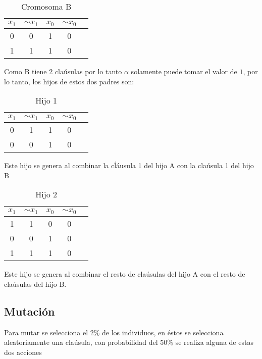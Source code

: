 \documentclass[a4paper]{article}
\begin{document}
\begin{table}[H]
	\centering
	\caption{Cromosoma B}
	\begin{tabular}{|c | c | c|  c|  c|}
		\hline
		$x_1$ & $ \sim{x_1}$ & $x_0$ & $ \sim{x_0}$\\
		\hline
		0 & 0& 1 & 0\\
		\hline
		1 & 1& 1 & 0\\
		\hline
	\end{tabular}
\end{table}

Como B tiene 2 claúsulas por lo tanto $\alpha$ solamente puede tomar el valor de $1$, por lo tanto, los hijos de estos dos padres son:

\begin{table}[H]
	\centering
	\caption{Hijo 1}
	\begin{tabular}{|c | c | c|  c|  c|}
		\hline
		$x_1$ & $ \sim{x_1}$ & $x_0$ & $ \sim{x_0}$\\
		\hline
		0 & 1& 1 & 0\\
		\hline
		0 & 0& 1 & 0\\
		\hline
	\end{tabular}
\end{table}

Este hijo se genera al combinar la cĺáusula 1 del hijo A con la claúsula 1 del hijo B

\begin{table}[H]
	\centering
	\caption{Hijo 2}
	\begin{tabular}{|c | c | c|  c|  c|}
		\hline
		$x_1$ & $ \sim{x_1}$ & $x_0$ & $ \sim{x_0}$\\
		\hline
		1 & 1& 0 & 0\\
		\hline
		0 & 0& 1 & 0\\
		\hline
		1 & 1& 1 & 0\\
		\hline
	\end{tabular}
\end{table}

Este hijo se genera al combinar el resto de claúsulas del hijo A con el resto de claúsulas del hijo B.

\subsection{Mutación}

Para mutar se selecciona el 2\% de los individuos, en éstos se selecciona aleatoriamente una claúsula, con probabilidad del 50\% se realiza alguna de estas dos acciones
\end{document}
